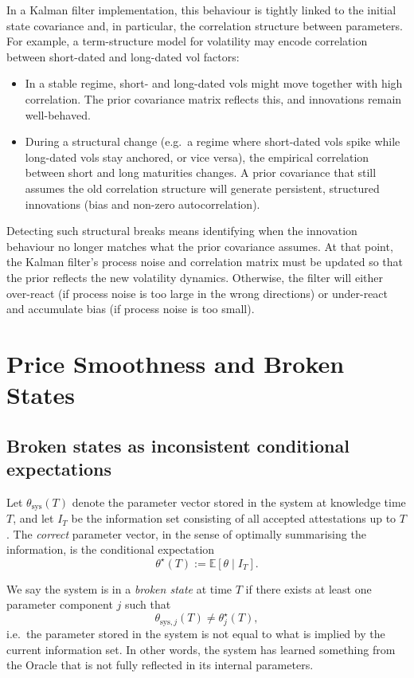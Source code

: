 \documentclass[11pt,a4paper]{article}
\begin{document}
In a Kalman filter implementation, this behaviour is tightly linked to the initial state covariance and, in particular, the correlation structure between parameters. For example, a term-structure model for volatility may encode correlation between short-dated and long-dated vol factors:
\begin{itemize}
    \item In a stable regime, short- and long-dated vols might move together with high correlation. The prior covariance matrix reflects this, and innovations remain well-behaved.
    \item During a structural change (e.g.\ a regime where short-dated vols spike while long-dated vols stay anchored, or vice versa), the empirical correlation between short and long maturities changes. A prior covariance that still assumes the old correlation structure will generate persistent, structured innovations (bias and non-zero autocorrelation).
\end{itemize}

Detecting such structural breaks means identifying when the innovation behaviour no longer matches what the prior covariance assumes. At that point, the Kalman filter's process noise and correlation matrix must be updated so that the prior reflects the new volatility dynamics. Otherwise, the filter will either over-react (if process noise is too large in the wrong directions) or under-react and accumulate bias (if process noise is too small).

\section{Price Smoothness and Broken States}

\subsection{Broken states as inconsistent conditional expectations}

Let $\theta_{\text{sys}}(T)$ denote the parameter vector stored in the system at knowledge time $T$, and let $I_T$ be the information set consisting of all accepted attestations up to $T$. The \textit{correct} parameter vector, in the sense of optimally summarising the information, is the conditional expectation
\[
    \theta^\star(T) := \mathbb{E}[\theta \mid I_T].
\]

We say the system is in a \textit{broken state} at time $T$ if there exists at least one parameter component $j$ such that
\[
    \theta_{\text{sys},j}(T) \neq \theta_j^\star(T),
\]
i.e.\ the parameter stored in the system is not equal to what is implied by the current information set. In other words, the system has learned something from the Oracle that is not fully reflected in its internal parameters.
\end{document}
